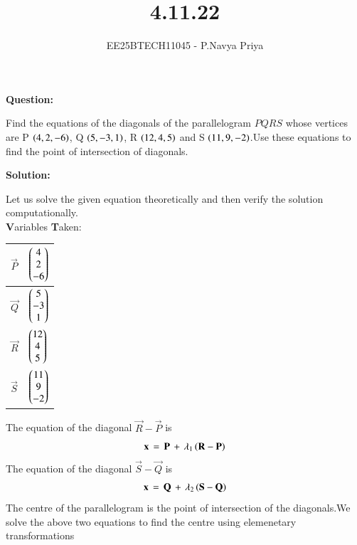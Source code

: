 \documentclass[journal,12pt,onecolumn]{IEEEtran}
\theoremstyle{remark}
\begin{document}
\title{4.11.22}
\author{EE25BTECH11045 - P.Navya Priya}
\maketitle
\renewcommand{\thefigure}{\theenumi}
\renewcommand{\thetable}{\theenumi}
\textbf{Question:}

Find the equations of the diagonals of the parallelogram $PQRS$ whose vertices are
 P $\left(4,2,-6\right)$, Q $\left(5,-3,1\right)$, R $\left(12,4,5\right)$ and S $\left(11,9,-2\right)$.Use these equations to find the
 point of intersection of diagonals.

\textbf{Solution:}

Let us solve the given equation theoretically and then verify the solution computationally.\\
\textbf{V}ariables \textbf{T}aken:
\begin{table}[H]
\centering
\renewcommand{\arraystretch}{1}
\begin{tabular}{|m{2cm}|m{2cm}|}
\hline
  $\vec{P}$   &  $\begin{pmatrix}4\\2\\-6\end{pmatrix}$ \\ \hline 
  $\vec{Q}$   &  $\begin{pmatrix}5\\-3\\1\end{pmatrix}$ \\ \hline
  $\vec{R}$   &  $\begin{pmatrix}12\\4\\5\end{pmatrix}$ \\ \hline
  $\vec{S}$   &  $\begin{pmatrix}11\\9\\-2\end{pmatrix}$ \\ \hline
\end{tabular}
\end{table}

The equation of the diagonal $\vec{R}-\vec{P}$ is
\begin{align}
    \mathbf{x}\,=\,\mathbf{P}\,+\,\lambda_1\left(\mathbf{R}-\mathbf{P}\right)
\end{align}
The equation of the diagonal $\vec{S}-\vec{Q}$ is
\begin{align}
     \mathbf{x}\,=\,\mathbf{Q}\,+\,\lambda_2\left(\mathbf{S}-\mathbf{Q}\right)
\end{align}
The centre of the parallelogram is the point of intersection of the diagonals.We solve the above two equations to find the centre using elemenetary transformations
\end{document}

